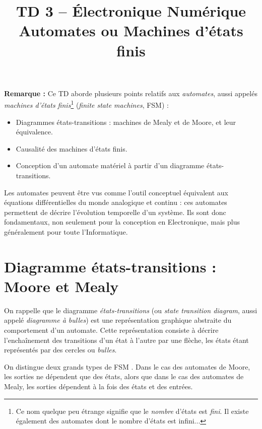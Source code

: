 \documentclass[a4paper,11pt]{article}
\title{\textcolor{primary}{\Huge\bfseries TD 3 -- Électronique Numérique}\\[0.5em] \Large Automates ou Machines d'états finis}
\author{}
\date{}
\begin{document}
\maketitle
\thispagestyle{fancy}   %
\vspace{-2em}

\begin{notebox}
\textbf{Remarque :}
Ce TD aborde plusieurs points relatifs aux \textit{automates}, aussi appelés \textit{machines d'états finis}\footnote{Ce nom quelque peu étrange signifie que le \textit{nombre} d'états est \textit{fini}. Il existe également des automates dont le nombre d'états est infini...} (\textit{finite state machines}, FSM) :
\begin{itemize}
    \item Diagrammes états-transitions : machines de Mealy et de Moore, et leur équivalence.
    \item Causalité des machines d'états finis.
    \item Conception d'un automate matériel à partir d'un diagramme états-transitions.
\end{itemize}

Les automates peuvent être vus comme l'outil conceptuel équivalent aux équations différentielles du monde analogique et continu : ces automates permettent de décrire l'évolution temporelle d'un système. Ils sont donc fondamentaux, non seulement pour la conception en Electronique, mais plus généralement pour toute l'Informatique.

\end{notebox}


\section{Diagramme états-transitions : Moore et Mealy}

On rappelle que le diagramme \textit{états-transitions} (ou \textit{state transition diagram}, aussi appelé \textit{diagramme à bulles}) est une représentation graphique abstraite du comportement d'un automate. Cette représentation consiste à décrire l'enchaînement des transitions d'un état à l'autre par une flèche, les états étant représentés par des cercles ou \textit{bulles}.

On distingue deux grands types de FSM
.
Dans le cas des automates de Moore, les sorties ne dépendent que des états, alors que dans le cas des automates de Mealy, les sorties dépendent à la fois des états et des entrées.
\end{document}
